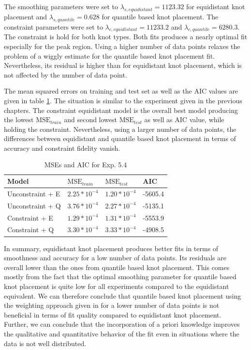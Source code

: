 \documentclass[10pt,a4paper]{article}
\begin{document}
The smoothing parameters were set to $\lambda_{s, equidistant} = 1123.32$ for equidistant knot placement and $\lambda_{s, quantile} = 0.628$ for quantile based knot placement. The constraint parameters were set to $\lambda_{c, equidistant} = 11233.2$ and $\lambda_{c, quantile} = 6280.3$. The constraint is hold for both knot types. Both fits produces a nearly optimal fit especially for the peak region. Using a higher number of data points relaxes the problem of a wiggly estimate for the quantile based knot placement fit. Nevertheless, its residual is higher than for equidistant knot placement, which is not affected by the number of data point.

The mean squared errors on training and test set as well as the AIC values are given in table \ref{tab:metrics_54}. The situation is similar to the experiment given in the previous chapters. The constraint equidistant model is the overall best model producing the lowest $\text{MSE}_{train}$ and second lowest $\text{MSE}_{test}$ as well as AIC value, while holding the constraint. Nevertheless, using a larger number of data points, the differences between equidistant and quantile based knot placement in terms of accuracy and constraint fidelity vanish. 

\begin{table}[H]
	\centering
	\begin{tabular}{|l|l|l|l|}
		\hline
		\textbf{Model} & \textbf{$\text{MSE}_{train}$} & \textbf{$\text{MSE}_{test}$}  & \textbf{AIC} \\ \hline \toprule
		Unconstraint + E  & $2.25 * 10^{-4}$  & $1.20 * 10^{-4}$ & -5605.4       \\ \hline
		Unconstraint + Q  & $3.76 * 10^{-4}$  & $2.27 * 10^{-4}$ & -5135.1      \\ \hline
		Constraint + E    & $1.29 * 10^{-4}$  & $1.31 * 10^{-4}$ & -5553.9      \\ \hline
		Constraint + Q    & $3.30 * 10^{-4}$  & $3.33 * 10^{-4}$ & -4908.5     \\ \hline \bottomrule
	\end{tabular}
	\caption{MSEs and AIC for Exp. 5.4}
	\label{tab:metrics_54}
\end{table}


In summary, equidistant knot placement produces better fits in terms of smoothness and accuracy for a low number of data points. Its residuals are overall lower than the ones from quantile based knot placement. This comes mostly from the fact that the optimal smoothing parameter for quantile based knot placement is quite low for all experiments compared to the equidistant equivalent. We can therefore conclude that quantile based knot placement using the weighting approach given in \cite{ferziger2008numerische} for a lower number of data points is not beneficial in terms of fit quality compared to equidistant knot placement. Further, we can conclude that the incorporation of a priori knowledge improves the qualitative and quantitative behavior of the fit even in situations where the data is not well distributed.  
\end{document}
